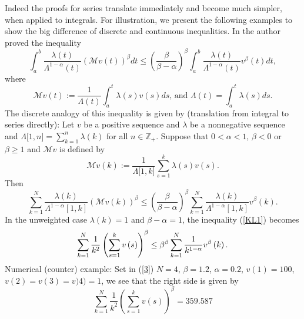 \documentclass[a4paper]{amsart}
\theoremstyle{plain}
\numberwithin{equation}{section}
\begin{document}
Indeed the proofs for series translate immediately and become much simpler,
when applied to integrals. For illustration, we present the following
examples to show the big difference of discrete and continuous inequalities.
In \cite{krnvsk1} the author proved the inequality 
\begin{equation}
\int_{a}^{b}\frac{\lambda (t)}{\Lambda ^{1-\alpha }(t)}\left( \mathcal{M}%
v\left( t\right) \right) ^{\beta }dt\leq \left( \frac{\beta }{\beta -\alpha }%
\right) ^{\beta }\int_{a}^{b}\frac{\lambda (t)}{\Lambda ^{1-\alpha }(t)}%
v^{\beta }\left( t\right) dt,  \label{hk}
\end{equation}%
where 
\begin{equation*}
\mathcal{M}v(t):=\frac{1}{\Lambda (t)}\int_{a}^{t}\lambda (s)v\left(
s\right) ds\text{, and }\Lambda (t)=\int_{a}^{t}\lambda (s)ds.
\end{equation*}%
The discrete analogy of this inequality is given by (translation from
integral to series directly): Let $v$ be a positive sequence and $\lambda $
be a nonnegative sequence and $\Lambda \lbrack
1,n]=\sum\limits_{k=1}^{n}\lambda (k)$ for all $n\in \mathbb{Z}_{+}$.
Suppose that $0<\alpha <1$, $\beta <0$ or $\beta \geq 1$ and $\mathcal{M}v$
is defined by%
\begin{equation*}
\mathcal{M}v(k):=\frac{1}{\Lambda \lbrack 1,k]}\sum\limits_{s=1}^{k}\lambda
(s)v\left( s\right) .
\end{equation*}%
Then%
\begin{equation}
\sum\limits_{k=1}^{N}\frac{\lambda (k)}{\Lambda ^{1-\alpha }[1,k]}\left( 
\mathcal{M}v\left( k\right) \right) ^{\beta }\leq \left( \frac{\beta }{\beta
-\alpha }\right) ^{\beta }\sum\limits_{k=1}^{N}\frac{\lambda (k)}{\Lambda
^{1-\alpha }[1,k]}v^{\beta }\left( k\right) .  \label{KL1}
\end{equation}%
In the unweighted case $\lambda (k)=1$ and $\beta -\alpha =1$, the
inequality (\ref{KL1}) becomes 
\begin{equation}
\sum\limits_{k=1}^{N}\frac{1}{k^{2}}\left( \sum\limits_{s=1}^{k}v\left(
s\right) \right) ^{\beta }\leq \beta ^{\beta }\sum\limits_{k=1}^{N}\frac{1}{%
k^{1-\alpha }}v^{\beta }\left( k\right) .  \label{3}
\end{equation}%
Numerical (counter) example: Set in (\ref{3}) $N=4$, $\beta =1.2$, $\alpha
=0.2$, $v(1)=100$, $v(2)=v(3)=v)4)=1$, we see that the right side is given by%
\begin{equation*}
\sum\limits_{k=1}^{N}\frac{1}{k^{2}}\left( \sum\limits_{s=1}^{k}v\left(
s\right) \right) ^{\beta }=359.587
\end{equation*}%
\end{document}
